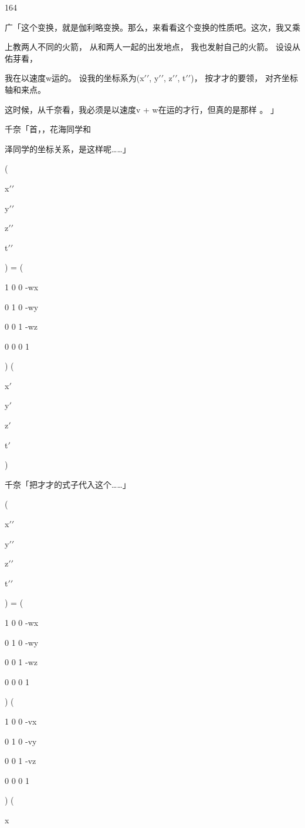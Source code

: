 164\par
广「这个变换，就是伽利略变换。那么，来看看这个变换的性质吧。这次，我又乘\par
上教两人不同的火箭， 从和两人一起的出发地点， 我也发射自己的火箭。 设设从佑芽看，\par
我在以速度w运的。 设我的坐标系为(x$\prime$$\prime$, y$\prime$$\prime$, z$\prime$$\prime$, t$\prime$$\prime$)， 按才才的要领， 对齐坐标轴和来点。\par
这时候，从千奈看，我必须是以速度v + w在运的才行，但真的是那样 。 」\par
千奈「首，，花海同学和\par
泽同学的坐标关系，是这样呢……」\par
(\par
x$\prime$$\prime$\par
y$\prime$$\prime$\par
z$\prime$$\prime$\par
t$\prime$$\prime$\par
) = (\par
1 0 0 -wx\par
0 1 0 -wy\par
0 0 1 -wz\par
0 0 0 1\par
) (\par
x$\prime$\par
y$\prime$\par
z$\prime$\par
t$\prime$\par
)\par
千奈「把才才的式子代入这个……」\par
(\par
x$\prime$$\prime$\par
y$\prime$$\prime$\par
z$\prime$$\prime$\par
t$\prime$$\prime$\par
) = (\par
1 0 0 -wx\par
0 1 0 -wy\par
0 0 1 -wz\par
0 0 0 1\par
) (\par
1 0 0 -vx\par
0 1 0 -vy\par
0 0 1 -vz\par
0 0 0 1\par
) (\par
x\par
